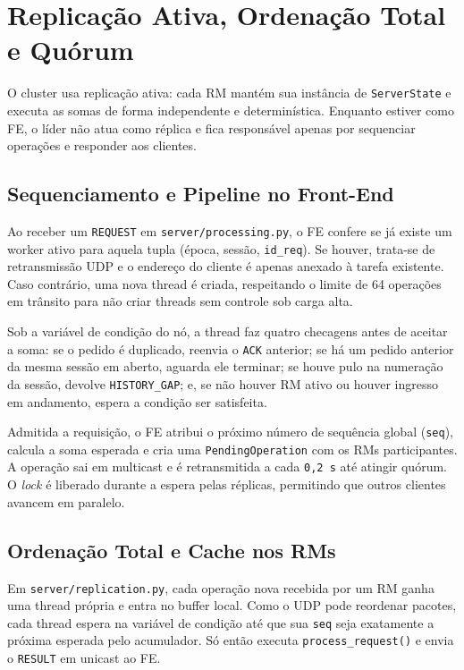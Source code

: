 \documentclass[12pt]{article}
\begin{document}
\section{Replicação Ativa, Ordenação Total e Quórum}

O cluster usa replicação ativa: cada RM mantém sua instância de \texttt{ServerState} e executa as somas de forma independente e determinística. Enquanto estiver como FE, o líder não atua como réplica e fica responsável apenas por sequenciar operações e responder aos clientes.

\subsection{Sequenciamento e Pipeline no Front-End}

Ao receber um \texttt{REQUEST} em \texttt{server/processing.py}, o FE confere se já existe um worker ativo para aquela tupla (época, sessão, \texttt{id\_req}). Se houver, trata-se de retransmissão UDP e o endereço do cliente é apenas anexado à tarefa existente. Caso contrário, uma nova thread é criada, respeitando o limite de 64 operações em trânsito para não criar threads sem controle sob carga alta.

Sob a variável de condição do nó, a thread faz quatro checagens antes de aceitar a soma: se o pedido é duplicado, reenvia o \texttt{ACK} anterior; se há um pedido anterior da mesma sessão em aberto, aguarda ele terminar; se houve pulo na numeração da sessão, devolve \texttt{HISTORY\_GAP}; e, se não houver RM ativo ou houver ingresso em andamento, espera a condição ser satisfeita.

Admitida a requisição, o FE atribui o próximo número de sequência global (\texttt{seq}), calcula a soma esperada e cria uma \texttt{PendingOperation} com os RMs participantes. A operação sai em multicast e é retransmitida a cada \texttt{0,2\,s} até atingir quórum. O \textit{lock} é liberado durante a espera pelas réplicas, permitindo que outros clientes avancem em paralelo.

\subsection{Ordenação Total e Cache nos RMs}

Em \texttt{server/replication.py}, cada operação nova recebida por um RM ganha uma thread própria e entra no buffer local. Como o UDP pode reordenar pacotes, cada thread espera na variável de condição até que sua \texttt{seq} seja exatamente a próxima esperada pelo acumulador. Só então executa \texttt{process\_request()} e envia o \texttt{RESULT} em unicast ao FE.
\end{document}
